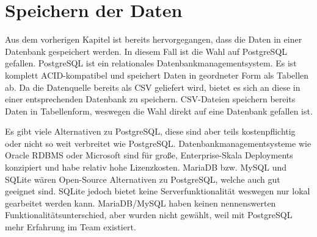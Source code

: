 \chapter{Speichern der Daten}

Aus dem vorherigen Kapitel ist bereits hervorgegangen, dass die Daten in einer Datenbank gespeichert werden.
In diesem Fall ist die Wahl auf PostgreSQL gefallen.
PostgreSQL ist ein relationales Datenbankmanagementsystem. Es ist komplett ACID-kompatibel und speichert Daten in geordneter Form als Tabellen ab.
Da die Datenquelle bereits als CSV geliefert wird, bietet es sich an diese in einer entsprechenden Datenbank zu speichern.
CSV-Dateien speichern bereits Daten in Tabellenform, weswegen die Wahl direkt auf eine Datenbank gefallen ist.

Es gibt viele Alternativen zu PostgreSQL, diese sind aber teils kostenpflichtig oder nicht so weit verbreitet wie PostgreSQL.
Datenbankmanagementsysteme wie Oracle RDBMS oder Microsoft sind für große, Enterprise-Skala Deployments konzipiert und habe relativ hohe Lizenzkosten.
MariaDB bzw. MySQL und SQLite wären Open-Source Alternativen zu PostgreSQL, welche auch gut geeignet sind.
SQLite jedoch bietet keine Serverfunktionalität weswegen nur lokal gearbeitet werden kann.
MariaDB/MySQL haben keinen nennenswerten Funktionalitätsunterschied, aber wurden nicht gewählt, weil mit PostgreSQL mehr Erfahrung im Team existiert.